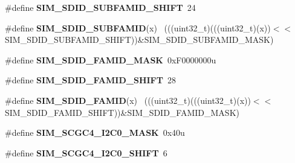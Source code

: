 \begin{DoxyCompactItemize}
\item 
\hypertarget{group___s_i_m___register___masks_ga5e40d63bf136287a591bb4fa0b019aba}{}\#define {\bfseries S\+I\+M\+\_\+\+S\+D\+I\+D\+\_\+\+S\+U\+B\+F\+A\+M\+I\+D\+\_\+\+S\+H\+I\+F\+T}~24\label{group___s_i_m___register___masks_ga5e40d63bf136287a591bb4fa0b019aba}

\item 
\hypertarget{group___s_i_m___register___masks_gaeb8cbd3ce47088f536b52d28b1f4a087}{}\#define {\bfseries S\+I\+M\+\_\+\+S\+D\+I\+D\+\_\+\+S\+U\+B\+F\+A\+M\+I\+D}(x)                                      ~(((uint32\+\_\+t)(((uint32\+\_\+t)(x))$<$$<$S\+I\+M\+\_\+\+S\+D\+I\+D\+\_\+\+S\+U\+B\+F\+A\+M\+I\+D\+\_\+\+S\+H\+I\+F\+T))\&S\+I\+M\+\_\+\+S\+D\+I\+D\+\_\+\+S\+U\+B\+F\+A\+M\+I\+D\+\_\+\+M\+A\+S\+K)\label{group___s_i_m___register___masks_gaeb8cbd3ce47088f536b52d28b1f4a087}

\item 
\hypertarget{group___s_i_m___register___masks_ga5344e7283b2aead14d9d3bded0114f3b}{}\#define {\bfseries S\+I\+M\+\_\+\+S\+D\+I\+D\+\_\+\+F\+A\+M\+I\+D\+\_\+\+M\+A\+S\+K}~0x\+F0000000u\label{group___s_i_m___register___masks_ga5344e7283b2aead14d9d3bded0114f3b}

\item 
\hypertarget{group___s_i_m___register___masks_ga377bc761e6ee1caab79baad3e2d0d331}{}\#define {\bfseries S\+I\+M\+\_\+\+S\+D\+I\+D\+\_\+\+F\+A\+M\+I\+D\+\_\+\+S\+H\+I\+F\+T}~28\label{group___s_i_m___register___masks_ga377bc761e6ee1caab79baad3e2d0d331}

\item 
\hypertarget{group___s_i_m___register___masks_ga1c53c57d3312af915fc5419efec0b651}{}\#define {\bfseries S\+I\+M\+\_\+\+S\+D\+I\+D\+\_\+\+F\+A\+M\+I\+D}(x)                                            ~(((uint32\+\_\+t)(((uint32\+\_\+t)(x))$<$$<$S\+I\+M\+\_\+\+S\+D\+I\+D\+\_\+\+F\+A\+M\+I\+D\+\_\+\+S\+H\+I\+F\+T))\&S\+I\+M\+\_\+\+S\+D\+I\+D\+\_\+\+F\+A\+M\+I\+D\+\_\+\+M\+A\+S\+K)\label{group___s_i_m___register___masks_ga1c53c57d3312af915fc5419efec0b651}

\item 
\hypertarget{group___s_i_m___register___masks_ga55fc2bdfb36e61b4771015749307c480}{}\#define {\bfseries S\+I\+M\+\_\+\+S\+C\+G\+C4\+\_\+\+I2\+C0\+\_\+\+M\+A\+S\+K}~0x40u\label{group___s_i_m___register___masks_ga55fc2bdfb36e61b4771015749307c480}

\item 
\hypertarget{group___s_i_m___register___masks_ga50185bca8ae97e6b0b0a70541757680b}{}\#define {\bfseries S\+I\+M\+\_\+\+S\+C\+G\+C4\+\_\+\+I2\+C0\+\_\+\+S\+H\+I\+F\+T}~6\label{group___s_i_m___register___masks_ga50185bca8ae97e6b0b0a70541757680b}


\end{DoxyCompactItemize}
